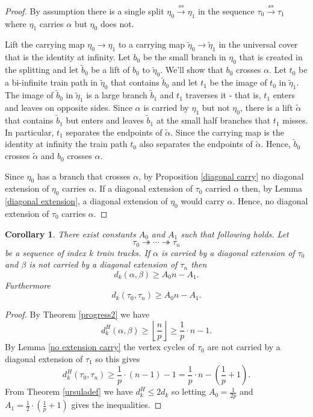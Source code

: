 \documentclass[11pt]{article}
\newtheorem{cor}[thm]{Corollary}
\theoremstyle{remark}
\def\ss{{\overset{ss}\longrightarrow}}
\begin{document}
\begin{proof}
By assumption there is a single split $\eta_0\ss \eta_1$ in the sequence $\tau_0 \ss\tau_1$ where $\eta_1$ carries $\alpha$ but $\eta_0$ does not.

Lift the carrying map $\eta_0 \to \eta_1$ to a carrying map $\tilde\eta_0 \to \tilde\eta_1$ in the universal cover that is the identity at infinity. Let $b_0$ be the small branch in $\eta_0$ that is created in the splitting and let $\tilde b_0$ be a lift of $b_0$ to $\tilde\eta_0$. We'll show that $b_0$ crosses $\alpha$. Let $t_0$ be a bi-infinite train path in $\tilde\eta_0$ that contains $\tilde b_0$ and let $t_1$ be the image of $t_0$ in $\tilde\eta_1$. The image of $\tilde b_0$ in $\tilde\eta_1$ is a large branch $\tilde b_1$ and $t_1$ traverses it - that is, $t_1$ enters and leaves on opposite sides. Since $\alpha$ is carried by $\eta_1$ but not $\eta_0$, there is a lift $\tilde\alpha$ that contains $\tilde b_1$ but enters and leaves $\tilde b_1$ at the small half branches that $t_1$ misses. In particular, $t_1$ separates the endpoints of $\tilde\alpha$. Since the carrying map is the identity at infinity the train path $t_0$ also separates the endpoints of $\tilde\alpha$. Hence, $\tilde b_0$ crosses $\tilde\alpha$ and $b_0$ crosses $\alpha$.

Since $\eta_0$ has a branch that crosses $\alpha$, by Proposition \ref{diagonal carry} no diagonal extension of $\eta_0$ carries $\alpha$. If a diagonal extension of $\tau_0$ carried $\alpha$ then, by Lemma \ref{diagonal extension}, a diagonal extension of $\eta_0$ would carry $\alpha$. Hence, no diagonal extension of $\tau_0$ carries $\alpha$.
\end{proof}

\begin{cor}\label{distance_lower}
There exist constants $A_0$ and $A_1$ such that following holds.
Let
$$\tau_0 \twoheadrightarrow \cdots \twoheadrightarrow \tau_n$$
be a sequence of index $k$ train tracks. If $\alpha$ is carried by a diagonal extension of $\tau_0$ and $\beta$ is not carried by a diagonal extension of $\tau_n$ then
$$d_k(\alpha, \beta) \ge A_0 n - A_1.$$
Furthermore
$$d_k(\tau_0, \tau_n) \ge A_0 n - A_1.$$
\end{cor}

\begin{proof} 
By Theorem \ref{progress2} we have
$$d^H_k(\alpha, \beta) \ge \left \lfloor \frac{n}p \right\rfloor \ge \frac1p\cdot n -1.$$
By Lemma \ref{no extension carry} the vertex cycles of $\tau_0$ are not carried by a diagonal extension of $\tau_1$ so this gives
$$d^H_k(\tau_0, \tau_n) \ge \frac1p\cdot(n-1) - 1 = \frac1p\cdot n -\left(\frac1p +1\right).$$
From Theorem \ref{ursuladef} we have $d^H_k \le 2d_k$ so letting $A_0 = \frac{1}{2p}$ and $A_1 = \frac12\cdot\left(\frac{1}p + 1\right)$ gives the inequalities.
\end{proof}
\end{document}
